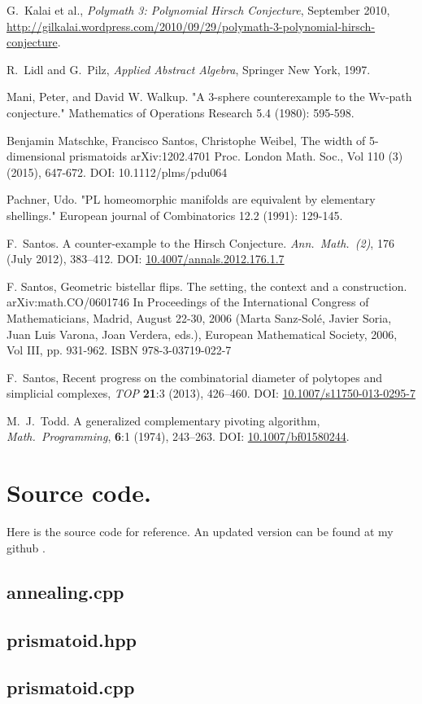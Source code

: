 \documentclass[12pt,a4paper]{article}
\theoremstyle{plain}
\theoremstyle{definition}
\begin{document}
\begin{thebibliography}{99}
G.~Kalai et al., \emph{Polymath 3: Polynomial Hirsch Conjecture}, September 2010,
\href{http://gilkalai.wordpress.com/2010/09/29/polymath-3-polynomial-hirsch-conjecture}
{http://gilkalai.wordpress.com/2010/09/29/polymath-3-polynomial-hirsch-conjecture}.

R.~Lidl and G.~Pilz,
 \emph{Applied Abstract Algebra},
 Springer New York, 1997.

  Mani, Peter, and David W. Walkup. "A 3-sphere counterexample to the Wv-path conjecture." Mathematics of Operations Research 5.4 (1980): 595-598.

Benjamin Matschke, Francisco Santos, Christophe Weibel, The width of 5-dimensional prismatoids
arXiv:1202.4701
Proc. London Math. Soc., Vol 110 (3) (2015), 647-672. DOI: 10.1112/plms/pdu064

  Pachner, Udo. "PL homeomorphic manifolds are equivalent by elementary shellings." European journal of Combinatorics 12.2 (1991): 129-145.

  F.~Santos.
  A counter-example to the Hirsch Conjecture.
  \emph{Ann.~Math.~(2)}, 176 (July 2012), 383--412. 
  DOI: \href{http://dx.doi.org/10.4007/annals.2012.176.1.7}{10.4007/annals.2012.176.1.7}

F. Santos, Geometric bistellar flips. The setting, the context and a construction.
arXiv:math.CO/0601746
In Proceedings of the International Congress of Mathematicians, Madrid, August 22-30, 2006 (Marta Sanz-Solé, Javier Soria, Juan Luis Varona, Joan Verdera, eds.), European Mathematical Society, 2006, Vol III, pp. 931-962. ISBN 978-3-03719-022-7 

F.~Santos, Recent progress on the combinatorial diameter of polytopes and simplicial complexes,
\emph{TOP} {\bf 21}:3 (2013), 426--460. 
DOI: \href{http://dx.doi.org/10.1007/s11750-013-0295-7}{10.1007/s11750-013-0295-7}

M.~J.~Todd.
A generalized complementary pivoting algorithm,
\emph{Math.~Programming}, {\bf 6}:1 (1974), 243--263.
DOI:  \href{http://dx.doi.org/10.1007/BF01580244}{10.1007/bf01580244}.

\end{thebibliography}

\newpage
\appendix
\section{Source code.}
Here is the source code for reference. An updated version can be found at my github \cite{github}.
\subsection{annealing.cpp}

\subsection{prismatoid.hpp}

\subsection{prismatoid.cpp}

\end{document}

